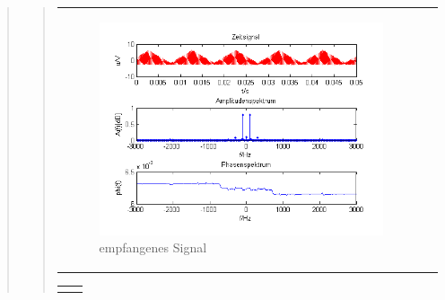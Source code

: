 \begin{quote}
\begin{quote}
\begin{center}
\begin{tabular}{ll}
            \begin{minipage}{0.6\textwidth}
                \begin{figure}[H]
                    \label{fig:DemodreieckoT2}
                    \includegraphics[scale=0.7]{Bilder/Demo_Dre_2k_100Hz_mo_ohneTiefpass}
                    \caption{empfangenes Signal}
                \end{figure}
        
            \end{minipage}
        
        \end{tabular}
        \end{center}
        
         \begin{center}
        \begin{tabular}{ll}
        
        \hspace{-5cm}
            \begin{minipage}{0.6\textwidth}
                

\end{minipage}
\end{tabular}
\end{center}
\end{quote}
\end{quote}
